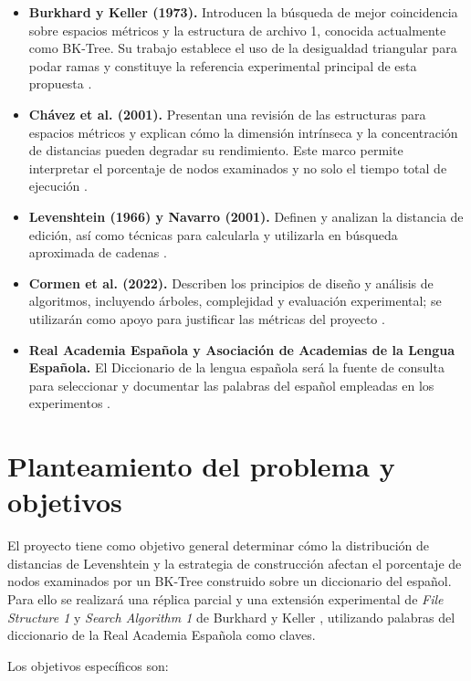 \documentclass[11pt]{article}
\begin{document}
\begin{itemize}[leftmargin=1.4em]
  \item \textbf{Burkhard y Keller (1973).} Introducen la búsqueda de mejor
  coincidencia sobre espacios métricos y la estructura de archivo 1, conocida
  actualmente como BK-Tree. Su trabajo establece el uso de la desigualdad
  triangular para podar ramas y constituye la referencia experimental
  principal de esta propuesta \cite{burkhard1973}.
  \item \textbf{Chávez et al. (2001).} Presentan una revisión de las
  estructuras para espacios métricos y explican cómo la dimensión intrínseca y
  la concentración de distancias pueden degradar su rendimiento. Este marco
  permite interpretar el porcentaje de nodos examinados y no solo el tiempo
  total de ejecución \cite{chavez2001searching}.
  \item \textbf{Levenshtein (1966) y Navarro (2001).} Definen y analizan la
  distancia de edición, así como técnicas para calcularla y utilizarla en
  búsqueda aproximada de cadenas \cite{levenshtein1966binary,navarro2001guided}.
  \item \textbf{Cormen et al. (2022).} Describen los principios de diseño y
  análisis de algoritmos, incluyendo árboles, complejidad y evaluación
  experimental; se utilizarán como apoyo para justificar las métricas del
  proyecto \cite{cormen2022}.
  \item \textbf{Real Academia Española y Asociación de Academias de la
  Lengua Española.} El Diccionario de la lengua española será la fuente de
  consulta para seleccionar y documentar las palabras del español empleadas
  en los experimentos \cite{rae2026}.
\end{itemize}

\section{Planteamiento del problema y objetivos} 

El proyecto tiene como objetivo general determinar cómo la distribución de
distancias de Levenshtein y la estrategia de construcción afectan el
porcentaje de nodos examinados por un BK-Tree construido sobre un diccionario
del español. Para ello se realizará una réplica parcial y una extensión
experimental de \emph{File Structure 1} y \emph{Search Algorithm 1} de
Burkhard y Keller \cite{burkhard1973}, utilizando palabras del diccionario de
la Real Academia Española \cite{rae2026} como claves.

Los objetivos específicos son:
\end{document}

